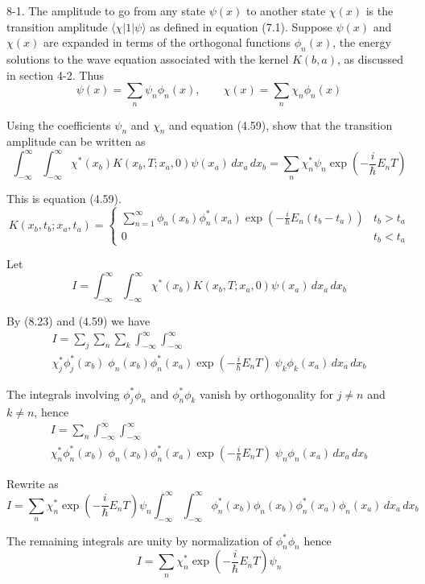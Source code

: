 \documentclass[12pt]{article}
\begin{document}
8-1.
The amplitude to go from any state $\psi(x)$ to another
state $\chi(x)$ is the transition amplitude $\langle\chi|1|\psi\rangle$
as defined in equation (7.1).
Suppose $\psi(x)$ and $\chi(x)$ are expanded in terms of the orthogonal
functions $\phi_n(x)$, the energy solutions to the wave equation associated
with the kernel $K(b,a)$, as discussed in section 4-2. Thus
\begin{equation*}
\psi(x)=\sum_n\psi_n\phi_n(x),\qquad\chi(x)=\sum_n\chi_n\phi_n(x)
\tag{8.23}
\end{equation*}

Using the coefficients $\psi_n$ and $\chi_n$ and equation (4.59),
show that the transition amplitude can be written as
\begin{equation*}
\int_{-\infty}^\infty\int_{-\infty}^\infty
\chi^*(x_b)K(x_b,T;x_a,0)\psi(x_a)\,dx_a\,dx_b
=\sum_n\chi_n^*\psi_n\exp\left(-\frac{i}{\hbar}E_nT\right)
\tag{8.24}
\end{equation*}

This is equation (4.59).
\begin{equation*}
K(x_b,t_b;x_a,t_a)=\begin{cases}
\sum_{n=1}^\infty\phi_n(x_b)\phi_n^*(x_a)
\exp\left(-\frac{i}{\hbar}E_n(t_b-t_a)\right) & t_b>t_a
\\
0 & t_b<t_a
\end{cases}
\tag{4.59}
\end{equation*}

Let
\begin{equation*}
I=\int_{-\infty}^\infty\int_{-\infty}^\infty
\chi^*(x_b)K(x_b,T;x_a,0)\psi(x_a)\,dx_a\,dx_b
\end{equation*}

By (8.23) and (4.59) we have
\begin{multline*}
I=\sum_j\sum_n\sum_k\int_{-\infty}^\infty\int_{-\infty}^\infty
\\
\chi_j^*\phi_j^*(x_b)
\;
\phi_n(x_b)\phi_n^*(x_a)\exp\left(-\frac{i}{\hbar}E_nT\right)
\;
\psi_k\phi_k(x_a)
\,dx_a\,dx_b
\end{multline*}

The integrals involving $\phi_j^*\phi_n$ and $\phi_n^*\phi_k$
vanish by orthogonality for $j\ne n$ and $k\ne n$, hence
\begin{multline*}
I=\sum_n\int_{-\infty}^\infty\int_{-\infty}^\infty
\\
\chi_n^*\phi_n^*(x_b)
\;
\phi_n(x_b)\phi_n^*(x_a)\exp\left(-\frac{i}{\hbar}E_nT\right)
\;
\psi_n\phi_n(x_a)
\,dx_a\,dx_b
\end{multline*}

Rewrite as
\begin{equation*}
I=\sum_n\chi_n^*\exp\left(-\frac{i}{\hbar}E_nT\right)\psi_n
\int_{-\infty}^\infty\int_{-\infty}^\infty
\phi_n^*(x_b)\phi_n(x_b)
\phi_n^*(x_a)\phi_n(x_a)
\,dx_a\,dx_b
\end{equation*}

The remaining integrals are unity by normalization of $\phi_n^*\phi_n$ hence
\begin{equation*}
I=\sum_n\chi_n^*\exp\left(-\frac{i}{\hbar}E_nT\right)\psi_n
\end{equation*}
\end{document}
